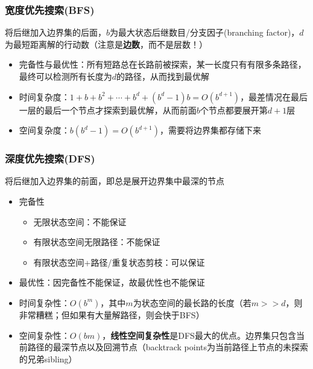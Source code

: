 \subsubsection{宽度优先搜索(BFS)}
将后继加入边界集的后面，$b$为最大状态后继数目/分支因子(branching factor)，$d$为最短距离解的行动数（注意是\textbf{边数}，而不是层数！）
\begin{itemize}
	\item 完备性与最优性：所有短路总在长路前被探索，某一长度只有有限多条路径，最终可以检测所有长度为$d$的路径，从而找到最优解
	\item 时间复杂度：$1+b+b^2+\cdots+b^d+(b^d-1)b=O(b^{d+1})$，最差情况在最后一层的最后一个节点才探索到最优解，从而前面$b$个节点都要展开第$d+1$层
	\item 空间复杂度：$b(b^d-1)=O(b^{d+1})$，需要将边界集都存储下来
\end{itemize}

\subsubsection{深度优先搜索(DFS)}
将后继加入边界集的前面，即总是展开边界集中最深的节点
\begin{itemize}
	\item 完备性
	\begin{itemize}
		\item 无限状态空间：不能保证
		\item 有限状态空间无限路径：不能保证
		\item 有限状态空间+路径/重复状态剪枝：可以保证
	\end{itemize}
	\item 最优性：因完备性不能保证，故最优性也不能保证
	\item 时间复杂性：$O(b^m)$，其中$m$为状态空间的最长路的长度（若$m>>d$，则非常糟糕；但如果有大量解路径，则会快于BFS）
	\item 空间复杂性：$O(bm)$，\textbf{线性空间复杂性}是DFS最大的优点。边界集只包含当前路径的最深节点以及回溯节点（backtrack points为当前路径上节点的未探索的兄弟sibling）
\end{itemize}

